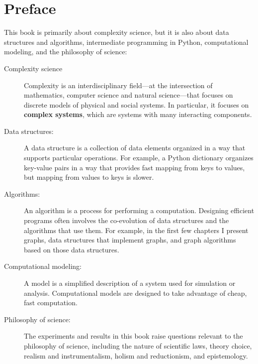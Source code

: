 \documentclass[12pt]{book}
\theoremstyle{exercise}
\begin{document}
\fi

\chapter{Preface}
\label{preface}


This book is primarily about complexity science, but it is also
about data structures and algorithms, intermediate
programming in Python, computational modeling, and the philosophy of
science:

\begin{description}

\item [Complexity science] Complexity is an interdisciplinary
  field---at the intersection of mathematics, computer science and
  natural science---that focuses on discrete models of physical and
  social systems.  In particular, it focuses on {\bf complex systems},
  which are systems with many interacting components.


\item[Data structures:] A data structure is a
  collection of data elements organized in a way that supports
  particular operations.  For example, a Python dictionary organizes
  key-value pairs in a way that provides fast mapping from keys to
  values, but mapping from values to keys is slower.


\item[Algorithms:] An algorithm is a process for performing a
  computation.  Designing efficient programs often involves the
  co-evolution of data structures and the algorithms that use them.
  For example, in the first few chapters I present graphs, data
  structures that implement graphs, and graph algorithms based on
  those data structures.


\item[Computational modeling:] A model is a simplified
  description of a system used for simulation or analysis.
  Computational models are designed to take advantage of cheap, fast
  computation.


\item[Philosophy of science:] The experiments and results in this book
  raise questions relevant to the philosophy of science,
  including the nature of scientific laws, theory choice, realism and
  instrumentalism, holism and reductionism, and epistemology.


\end{description}
\end{document}
